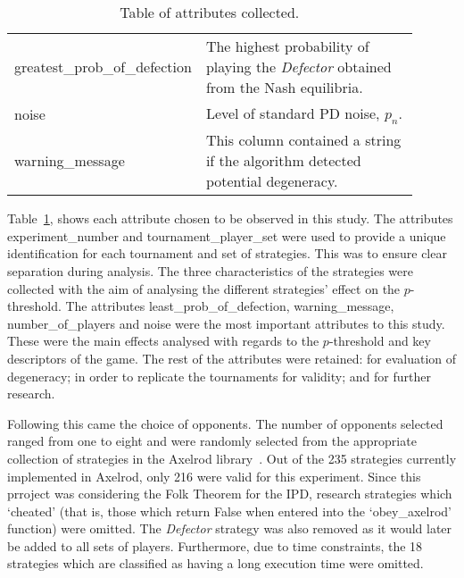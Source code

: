 \begin{table}
\begin{tabular}{>{\raggedright}p{0.3\linewidth}>{\raggedright\arraybackslash}p{0.6\linewidth}}
    greatest\_prob\_of\_defection  & The highest probability of playing the
    \textit{Defector} obtained from the Nash equilibria. \\
    
    noise                       & Level of standard PD noise, \(p_{n}\). \\
                      
    warning\_message             & This column contained a string if the
    algorithm detected potential degeneracy. \\
    \bottomrule
\end{tabular}
\caption{Table of attributes collected.}\label{tab:attr_tab} 
\end{table}

\newpage
Table~\ref{tab:attr_tab}, shows each attribute chosen to be observed in this
study. The attributes experiment\_number and tournament\_player\_set were used
to provide a unique identification for each tournament and set of strategies.
This was to ensure clear separation during analysis. The three characteristics of the strategies
were collected with the aim of analysing the different strategies'
effect on the \(p\)-threshold. The attributes least\_prob\_of\_defection,
warning\_message, number\_of\_players and noise were the most important
attributes to this study. These were the main effects analysed with regards to the \(p\)-threshold and key descriptors of the game. The rest of the attributes
were retained: for evaluation of degeneracy; in order to replicate the
tournaments for validity; and for further research.

Following this came the choice of opponents. The number of opponents selected
ranged from one to eight and were randomly selected from the appropriate
collection of strategies in the Axelrod library~\cite{axelrodproject}. Out of
the 235 strategies currently implemented in Axelrod, only 216 were valid for
this experiment. Since this prroject was considering the Folk Theorem for the IPD,
research strategies which `cheated' (that is, those which return False when
entered into the `obey\_axelrod' function) were omitted. The \textit{Defector} strategy
was also removed as it would later be added to all sets of players. Furthermore,
due to time constraints, the 18 strategies which are classified as having a long
execution time were omitted. 


